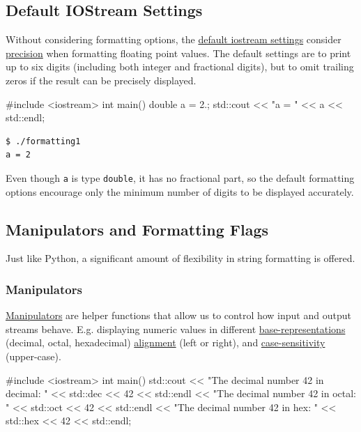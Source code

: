 \documentclass[12pt,letterpaper,twoside]{article}
\begin{document}
\subsection{Default IOStream Settings}
Without considering formatting options, 
the \href{https://en.cppreference.com/w/cpp/io/basic_ios/init}{default iostream settings} 
consider 
\href{https://en.cppreference.com/w/cpp/io/ios_base/precision}{precision} when 
formatting floating point values. The default settings 
are to print up to six digits (including both integer and fractional digits), but to 
omit trailing zeros if the result can be precisely displayed.
\begin{cpp}
#include <iostream>
int main() {
  double a = 2.;
  std::cout << "a = " << a << std::endl;
}
\end{cpp}

\begin{verbatim}
$ ./formatting1
a = 2
\end{verbatim}
Even though \texttt{a} is type \texttt{double}, it has no fractional part, so the 
default formatting options encourage only the minimum number of digits to be 
displayed accurately.


\subsection{Manipulators and Formatting Flags}
Just like Python, a significant amount of flexibility in string formatting is offered.

\subsubsection{Manipulators} 
\href{https://en.cppreference.com/w/cpp/io/manip}{Manipulators}
are helper functions that allow us to control 
how input and output streams behave. E.g. displaying numeric values in 
different \href{https://en.cppreference.com/w/cpp/io/manip/hex}{base-representations} 
(decimal, octal, hexadecimal) 
\href{https://en.cppreference.com/w/cpp/io/manip/left}{alignment} 
(left or right), and
\href{https://en.cppreference.com/w/cpp/io/manip/uppercase}{case-sensitivity} (upper-case).

\begin{cpp}
#include <iostream>
int main() {
    std::cout << "The decimal number 42 in decimal: " << std::dec << 42 << std::endl
              << "The decimal number 42 in octal:   " << std::oct << 42 << std::endl
              << "The decimal number 42 in hex:     " << std::hex << 42 << std::endl;
} \end{cpp}
\end{document}
